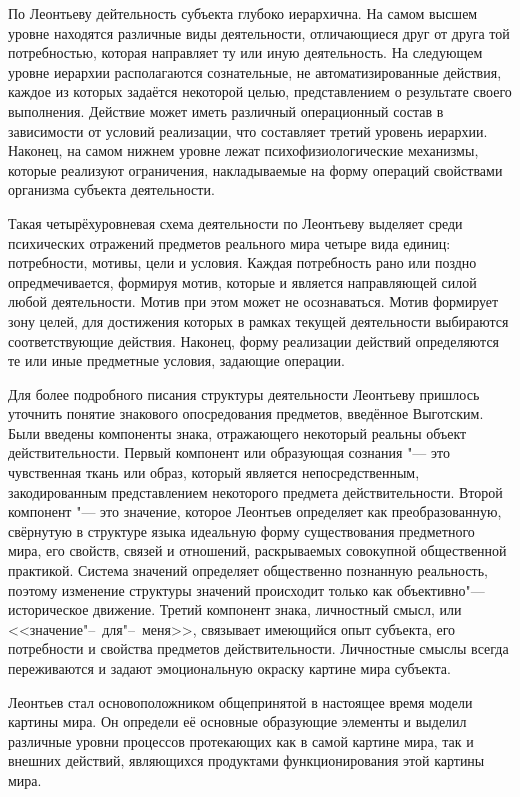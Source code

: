 По Леонтьеву дейтельность субъекта глубоко иерархична. На самом высшем уровне находятся различные виды деятельности, отличающиеся друг от друга той потребностью, которая направляет ту или иную деятельность. На следующем уровне иерархии располагаются сознательные, не автоматизированные действия, каждое из которых задаётся некоторой целью, представлением о результате своего выполнения. Действие может иметь различный операционный состав в зависимости от условий реализации, что составляет третий уровень иерархии. Наконец, на самом нижнем уровне лежат психофизиологические механизмы, которые реализуют ограничения, накладываемые на форму операций свойствами организма субъекта деятельности.

Такая четырёхуровневая схема деятельности по Леонтьеву выделяет среди психических отражений предметов реального мира четыре вида единиц: потребности, мотивы, цели и условия. Каждая потребность рано или поздно опредмечивается, формируя мотив, которые и является направляющей силой любой деятельности. Мотив при этом может не осознаваться. Мотив формирует зону целей, для достижения которых в рамках текущей деятельности выбираются соответствующие действия. Наконец, форму реализации действий определяются те или иные предметные условия, задающие операции.

Для более подробного писания структуры деятельности Леонтьеву пришлось уточнить понятие знакового опосредования предметов, введённое Выготским. Были введены компоненты знака, отражающего некоторый реальны объект действительности. Первый компонент или образующая сознания "--- это чувственная ткань или образ, который является непосредственным, закодированным представлением некоторого предмета действительности. Второй компонент "--- это значение, которое Леонтьев определяет как преобразованную, свёрнутую в структуре языка идеальную форму существования предметного мира, его свойств, связей и отношений, раскрываемых совокупной общественной практикой. Система значений определяет общественно познанную реальность, поэтому изменение структуры значений происходит только как объективно"---историческое движение. Третий компонент знака, личностный смысл, или <<значение"--~для"--~меня>>, связывает имеющийся опыт субъекта, его потребности и свойства предметов действительности. Личностные смыслы всегда переживаются и задают эмоциональную окраску картине мира субъекта.

Леонтьев стал основоположником общепринятой в настоящее время модели картины мира. Он определи её основные образующие элементы и выделил различные уровни процессов протекающих как в самой картине мира, так и внешних действий, являющихся продуктами функционирования этой картины мира.

